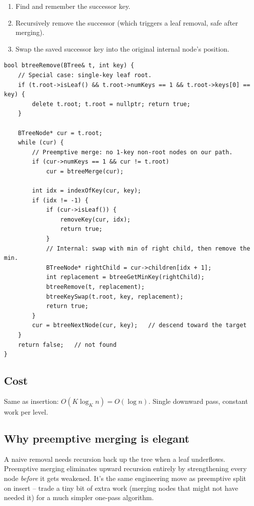 \documentclass[11pt]{article}
\begin{document}
\begin{enumerate}[leftmargin=*]
    \item Find and remember the successor key.
    \item Recursively remove the successor (which triggers a leaf removal, safe after merging).
    \item Swap the saved successor key into the original internal node's position.
\end{enumerate}

\begin{lstlisting}[basicstyle=\ttfamily\small,frame=single]
bool btreeRemove(BTree& t, int key) {
    // Special case: single-key leaf root.
    if (t.root->isLeaf() && t.root->numKeys == 1 && t.root->keys[0] == key) {
        delete t.root; t.root = nullptr; return true;
    }

    BTreeNode* cur = t.root;
    while (cur) {
        // Preemptive merge: no 1-key non-root nodes on our path.
        if (cur->numKeys == 1 && cur != t.root)
            cur = btreeMerge(cur);

        int idx = indexOfKey(cur, key);
        if (idx != -1) {
            if (cur->isLeaf()) {
                removeKey(cur, idx);
                return true;
            }
            // Internal: swap with min of right child, then remove the min.
            BTreeNode* rightChild = cur->children[idx + 1];
            int replacement = btreeGetMinKey(rightChild);
            btreeRemove(t, replacement);
            btreeKeySwap(t.root, key, replacement);
            return true;
        }
        cur = btreeNextNode(cur, key);   // descend toward the target
    }
    return false;   // not found
}
\end{lstlisting}

\subsection*{Cost}

Same as insertion: $O(K \log_K n) = O(\log n)$. Single downward pass, constant work per level.

\subsection*{Why preemptive merging is elegant}

\begin{ideabox}
A naive removal needs recursion back up the tree when a leaf underflows. Preemptive merging eliminates upward recursion entirely by strengthening every node \emph{before} it gets weakened. It's the same engineering move as preemptive split on insert -- trade a tiny bit of extra work (merging nodes that might not have needed it) for a much simpler one-pass algorithm.
\end{ideabox}
\end{document}
